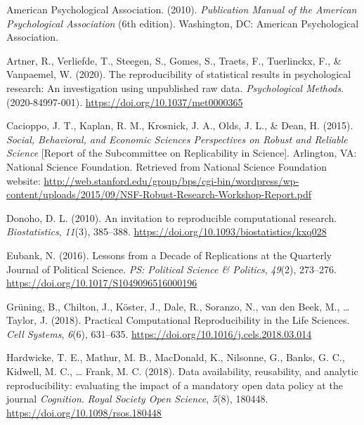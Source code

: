 \documentclass[
  english,
  ,man,floatsintext]{apa6}
\newlength{\cslhangindent}
\newenvironment{CSLReferences}[2] %
 {\begin{list}{}{%
  \setlength{\itemindent}{0pt}
  \setlength{\leftmargin}{0pt}
  \setlength{\parsep}{0pt}
  \ifodd #1
   \setlength{\leftmargin}{\cslhangindent}
   \setlength{\itemindent}{-1\cslhangindent}
  \fi
  \setlength{\itemsep}{#2\baselineskip}}}
 {\end{list}}
\begin{document}
\protect{}\label{refs}
\begin{CSLReferences}{1}{0}
American Psychological Association. (2010). \emph{Publication Manual of the American Psychological Association} (6th edition). Washington, DC: American Psychological Association.

Artner, R., Verliefde, T., Steegen, S., Gomes, S., Traets, F., Tuerlinckx, F., \& Vanpaemel, W. (2020). The reproducibility of statistical results in psychological research: An investigation using unpublished raw data. \emph{Psychological Methods}. (2020-84997-001). \url{https://doi.org/10.1037/met0000365}

Cacioppo, J. T., Kaplan, R. M., Krosnick, J. A., Olds, J. L., \& Dean, H. (2015). \emph{Social, Behavioral, and Economic Sciences Perspectives on Robust and Reliable Science} {[}Report of the Subcommittee on Replicability in Science{]}. Arlington, VA: National Science Foundation. Retrieved from National Science Foundation website: \url{http://web.stanford.edu/group/bps/cgi-bin/wordpress/wp-content/uploads/2015/09/NSF-Robust-Research-Workshop-Report.pdf}

Donoho, D. L. (2010). An invitation to reproducible computational research. \emph{Biostatistics}, \emph{11}(3), 385--388. \url{https://doi.org/10.1093/biostatistics/kxq028}

Eubank, N. (2016). Lessons from a Decade of Replications at the Quarterly Journal of Political Science. \emph{PS: Political Science \& Politics}, \emph{49}(2), 273--276. \url{https://doi.org/10.1017/S1049096516000196}

Grüning, B., Chilton, J., Köster, J., Dale, R., Soranzo, N., van den Beek, M., \ldots{} Taylor, J. (2018). Practical Computational Reproducibility in the Life Sciences. \emph{Cell Systems}, \emph{6}(6), 631--635. \url{https://doi.org/10.1016/j.cels.2018.03.014}

Hardwicke, T. E., Mathur, M. B., MacDonald, K., Nilsonne, G., Banks, G. C., Kidwell, M. C., \ldots{} Frank, M. C. (2018). Data availability, reusability, and analytic reproducibility: evaluating the impact of a mandatory open data policy at the journal \emph{Cognition}. \emph{Royal Society Open Science}, \emph{5}(8), 180448. \url{https://doi.org/10.1098/rsos.180448}


\end{CSLReferences}
\end{document}
